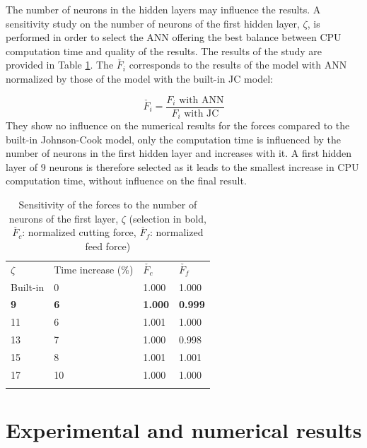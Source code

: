\documentclass[preprint,12pt,times]{elsarticle}
\begin{document}
The number of neurons in the hidden layers may influence the results. A sensitivity study on the number of neurons of the first hidden layer, $\zeta$, is performed in order to select the ANN offering the best balance between CPU computation time and quality of the results. The results of the study are provided in Table \ref{tab:NbNeurons}. The $\check{F_i}$ corresponds to the results of the model with ANN normalized by those of the model with the built-in JC model:

\begin{equation}
\check{F_i} = \frac{F_i\text{ with ANN}}{F_i\text{ with JC}}
\end{equation}
%
They show no influence on the numerical results for the forces compared to the built-in Johnson-Cook model, only the computation time is influenced by the number of neurons in the first hidden layer and increases with it. A first hidden layer of 9 neurons is therefore selected as it leads to the smallest increase in CPU computation time, without influence on the final result.

%
\begin{table}[!h]
\begin{center}
\caption{\label{tab:NbNeurons} Sensitivity of the forces to the number of neurons of the first layer, $\zeta$
(selection in bold, $\check{F_c}$: normalized cutting force, $\check{F_f}$: normalized feed force)}
\begin{tabular}{llll}
\hline\noalign{\smallskip}
$\zeta$  & Time increase (\unit{\%}) & $\check{F_c}$ & $\check{F_f}$\\
\noalign{\smallskip}\hline\noalign{\smallskip}
Built-in & 0 & 1.000 & 1.000\\
\textbf{9} & \textbf{6} & \textbf{1.000} & \textbf{0.999}\\
11 & 6 & 1.001 & 1.000\\
13 & 7 & 1.000 & 0.998\\
15 & 8 & 1.001 & 1.001\\
17 & 10 & 1.000 & 1.000\\
\noalign{\smallskip}\hline
\end{tabular}
\end{center}
\end{table}
%

\section{Experimental and numerical results\label{sec:ExpNumResults}}
\label{Results}
\end{document}
